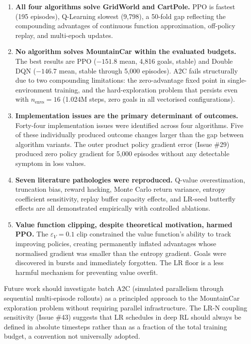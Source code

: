 \documentclass[a4paper,12pt]{article}
\begin{document}
\begin{enumerate}
  \item \textbf{All four algorithms solve GridWorld and CartPole.} PPO is fastest (195 episodes), Q-Learning slowest (9,798), a 50-fold gap reflecting the compounding advantages of continuous function approximation, off-policy replay, and multi-epoch updates.

  \item \textbf{No algorithm solves MountainCar within the evaluated budgets.} The best results are PPO ($-151.8$ mean, 4,816 goals, stable) and Double DQN ($-146.7$ mean, stable through 5,000 episodes). A2C fails structurally due to two compounding limitations: the zero-advantage fixed point in single-environment training, and the hard-exploration problem that persists even with $n_\text{envs}=16$ (1.024M steps, zero goals in all vectorised configurations).

  \item \textbf{Implementation issues are the primary determinant of outcomes.} Forty-four implementation issues were identified across four algorithms. Five of these individually produced outcome changes larger than the gap between algorithm variants. The outer product policy gradient error (Issue \#29) produced zero policy gradient for 5,000 episodes without any detectable symptom in loss values.

  \item \textbf{Seven literature pathologies were reproduced.} Q-value overestimation, truncation bias, reward hacking, Monte Carlo return variance, entropy coefficient sensitivity, replay buffer capacity effects, and LR-seed butterfly effects are all demonstrated empirically with controlled ablations.

  \item \textbf{Value function clipping, despite theoretical motivation, harmed PPO.} The $\varepsilon_V=0.1$ clip constrained the value function's ability to track improving policies, creating permanently inflated advantages whose normalised gradient was smaller than the entropy gradient. Goals were discovered in bursts and immediately forgotten. The LR floor is a less harmful mechanism for preventing value overfit.
\end{enumerate}

Future work should investigate batch A2C (simulated parallelism through sequential multi-episode rollouts) as a principled approach to the MountainCar exploration problem without requiring parallel infrastructure. The LR-N coupling sensitivity (Issue \#43) suggests that LR schedules in deep RL should always be defined in absolute timesteps rather than as a fraction of the total training budget, a convention not universally adopted.
\end{document}
